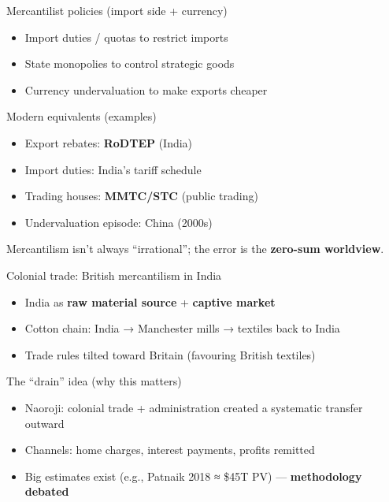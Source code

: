 \documentclass[
  ignorenonframetext,
  aspectratio=169,
]{beamer}
\makeatletter
\providecommand{\tightlist}{%
  \setlength{\itemsep}{0pt}\setlength{\parskip}{0pt}}
\let\quarto@originallabel\label
\DeclareRobustCommand*{\label}[1]{\quarto@originallabel{#1}}
\makeatother
\begin{document}
\begin{frame}{Mercantilist policies (import side + currency)}
\label{mercantilist-policies-import-side-currency}
\begin{itemize}
\tightlist
\item
  Import duties / quotas to restrict imports
\item
  State monopolies to control strategic goods
\item
  Currency undervaluation to make exports cheaper
\end{itemize}
\end{frame}

\begin{frame}{Modern equivalents (examples)}
\label{modern-equivalents-examples}
\begin{itemize}
\tightlist
\item
  Export rebates: \textbf{RoDTEP} (India)
\item
  Import duties: India's tariff schedule
\item
  Trading houses: \textbf{MMTC/STC} (public trading)
\item
  Undervaluation episode: China (2000s)
\end{itemize}

Mercantilism isn't always ``irrational''; the error is the
\textbf{zero-sum worldview}.
\end{frame}

\begin{frame}{Colonial trade: British mercantilism in India}
\label{colonial-trade-british-mercantilism-in-india}
\begin{itemize}
\tightlist
\item
  India as \textbf{raw material source} + \textbf{captive market}
\item
  Cotton chain: India → Manchester mills → textiles back to India
\item
  Trade rules tilted toward Britain (favouring British textiles)
\end{itemize}
\end{frame}

\begin{frame}{The ``drain'' idea (why this matters)}
\label{the-drain-idea-why-this-matters}
\begin{itemize}
\tightlist
\item
  Naoroji: colonial trade + administration created a systematic transfer
  outward
\item
  Channels: home charges, interest payments, profits remitted
\item
  Big estimates exist (e.g., Patnaik 2018 ≈ \$45T PV) ---
  \textbf{methodology debated}
\end{itemize}
\end{frame}
\end{document}
